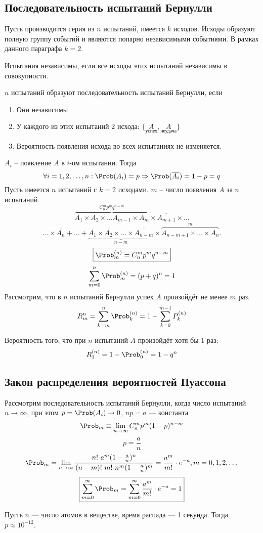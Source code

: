 \subsection{Последовательность испытаний Бернулли}
Пусть производится серия из $n$ испытаний, имеется $k$ исходов. Исходы образуют полную группу событий и являются попарно независимыми событиями. В рамках данного параграфа $k = 2$.
\begin{definition}
	Испытания независимы, если все исходы этих испытаний независимы в совокупности.
\end{definition}
\begin{definition}
	$n$ испытаний образуют последовательность испытаний Бернулли, если
	\begin{enumerate}
		\item Они независимы
		\item У каждого из этих испытаний 2 исхода: $\{\underset{\text{успех}}{A}, \underset{\text{неудача}}{\overline{A}} \}$
		\item Вероятность появления исхода во всех испытаниях не изменяется.
	\end{enumerate}
\end{definition}
$A_i$ -- появление $A$ в $i$-ом испытании. Тогда
\[ \forall i=\To n : \Prob(A_i) = p \Rightarrow \Prob(\overline{A_i}) = 1 - p = q \]
Пусть имеется $n$ испытаний с $k=2$ исходами. $m$ -- число появления $A$ за $n$ испытаний
\[ \overbrace{A_1 \times A_2 \times \dots A_{m-1} \times A_m}^{C_n^m p^m q^{n-m}} \times \overline{A_{m+1}} \times \dots \]
\[ \ldots \times \overline{A_n} + \ldots + \underbrace{\overline{A_1} \times \overline{A_2} \times \dots \times \overline{A_{n-m}}}_{n-m} \times \overbrace{A_{n-m+1} \times \ldots \times A_n}^m.\]
\[
	\boxed{\Prob_m^{(n)} = C_n^m p^m q^{n-m}}
\]
\[
	\sum\limits_{m=0}^n \Prob_m^{(n)} = (p + q)^n = 1
\]
Рассмотрим, что в $n$ испытаний Бернулли успех $A$ произойдёт не менее $m$ раз.
\[
	R_m^{n} = \sum\limits_{k = m}^n \Prob_k^{(n)} = 1 - \sum\limits_{k=0}^{m-1} P_k^{(n)}
\]
\begin{example}
	Вероятность того, что при $n$ испытаний $A$ произойдёт хотя бы 1 раз:
	\[ R_1^{(n)} = 1 - \Prob_0^{(n)} = 1 - q^n \]
\end{example}
\subsection{Закон распределения вероятностей Пуассона}
Рассмотрим последовательность испытаний Бернулли, когда число испытаний $n \to \infty$, при этом $p = \Prob(A_i) \to 0$, $np = a$ --- константа
\[
	\Prob_m \equiv \lim_{n \to \infty} C_n^m p^m (1-p)^{n-m}
\]
\[ p = \frac{a}{n} \]
\[ \Prob_m = \lim_{n \to \infty} \frac{n!\ a^m (1 - \frac{a}{n})^n}{(n-m)!\ m!\ n^m (1 - \frac{a}{n})^m} = \frac{a^m}{m!} \cdot e^{-a}, m = 0, 1, 2, \dots \]
\[ \boxed{\sum\limits_{m=0}^\infty \Prob_m = \sum\limits_{m=0}^\infty \frac{a^m}{m!} \cdot e^{-a} = 1}\]
\begin{example}
	Пусть $n$ --- число атомов в веществе, время распада --- 1 секунда. Тогда $p \approx 10^{-12}$.
\end{example}

